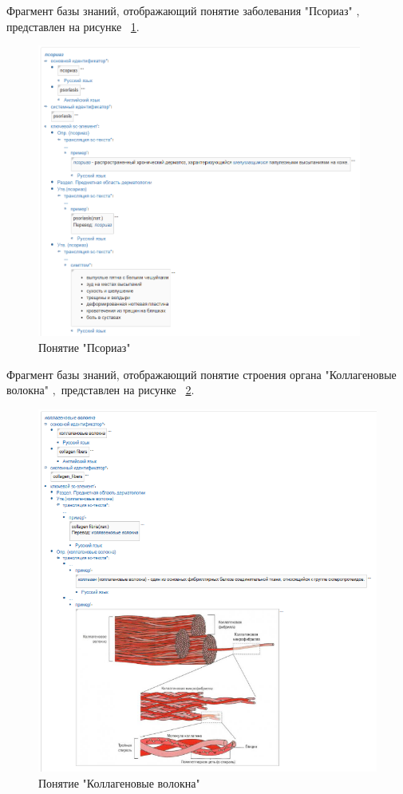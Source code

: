 Фрагмент базы знаний, отображающий  понятие заболевания "Псориаз" \cite{medi}$,$ представлен на рисунке
~\ref{fig:sections/psoriasis}.
\begin{figure}[H]
	\centering
	\includegraphics[width=0.95\textwidth]{sections/psoriasis.png}
	\caption{Понятие "Псориаз"}
	\label{fig:sections/psoriasis}
\end{figure}

Фрагмент базы знаний, отображающий  понятие строения органа "Коллагеновые волокна" \cite{bme}$,$ представлен на рисунке
~\ref{fig:sections/concept_collagen_fibers}.
\begin{figure}[H]
	\centering
	\includegraphics[width=1.05\textwidth]{sections/concept_collagen_fibers.png}
	\caption{Понятие "Коллагеновые волокна"}
	\label{fig:sections/concept_collagen_fibers}
\end{figure}

